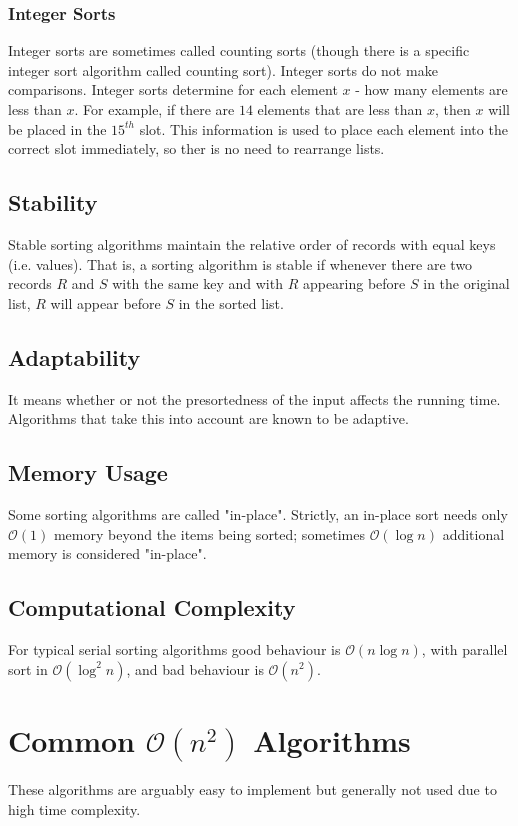 \documentclass[twoside,12pt,a4paper,english]{book}
\theoremstyle{definition}
\theoremstyle{problemstyle}
\begin{document}
\subsubsection{Integer Sorts}
Integer sorts are sometimes called counting sorts (though there is a specific integer sort algorithm called counting sort). Integer sorts do not make comparisons. Integer sorts determine for each element $x$ - how many elements are less than $x$. For example, if there are $14$ elements that are less than $x$, then $x$ will be placed in the $15^{th}$ slot. This information is used to place each element into the correct slot immediately, so ther is no need to rearrange lists.
\subsection{Stability}
Stable sorting algorithms maintain the relative order of records with equal keys (i.e. values). That is, a sorting algorithm is stable if whenever there are two records $R$ and $S$ with the same key and with $R$ appearing before $S$ in the original list, $R$ will appear before $S$ in the sorted list.
\subsection{Adaptability}
It means whether or not the presortedness of the input affects the running time. Algorithms that take this into account are known to be adaptive.
\subsection{Memory Usage}
Some sorting algorithms are called "in-place". Strictly, an in-place sort needs only $\mathcal{O}(1)$ memory beyond the items being sorted; sometimes $\mathcal{O}(\log{n})$ additional memory is considered "in-place".
\subsection{Computational Complexity}
For typical serial sorting algorithms good behaviour is $\mathcal{O}(n\log{n})$, with parallel sort in $\mathcal{O}(\log^{2}{n})$, and bad behaviour is $\mathcal{O}(n^2)$.
\section{Common $\mathcal{O}(n^2)$ Algorithms}
These algorithms are arguably easy to implement but generally not used due to high time complexity.
\end{document}
